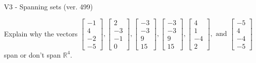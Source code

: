 \begin{exercise}
  \begin{exerciseTitle}V3 - Spanning sets (ver. 499)\end{exerciseTitle}
  \begin{exerciseStatement}
    Explain why the vectors \(\left[\begin{array}{r}
-1 \\
4 \\
-2 \\
-5
\end{array}\right] , \left[\begin{array}{r}
2 \\
-3 \\
-1 \\
0
\end{array}\right] , \left[\begin{array}{r}
-3 \\
-3 \\
9 \\
15
\end{array}\right] , \left[\begin{array}{r}
-3 \\
-3 \\
9 \\
15
\end{array}\right] , \left[\begin{array}{r}
4 \\
1 \\
-4 \\
2
\end{array}\right] , \text{ and } \left[\begin{array}{r}
-5 \\
4 \\
-4 \\
-5
\end{array}\right]\) span or don't span \(\mathbb{R}^4\). 
	



\end{exerciseStatement}
\end{exercise}
